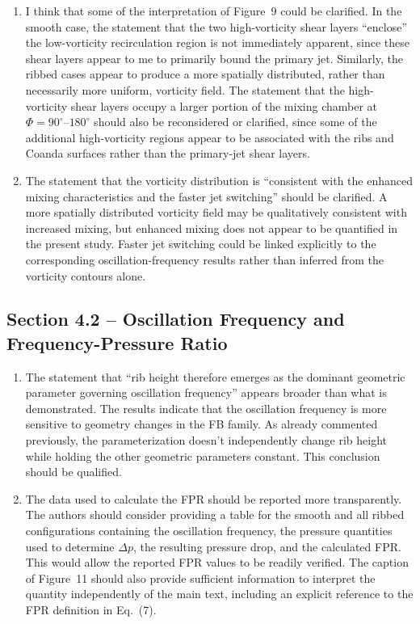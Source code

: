 \documentclass[11pt]{article}
\begin{document}
\begin{enumerate}
		\item I think that some of the interpretation of Figure~9 could be clarified. In the smooth case, the statement that the two high-vorticity shear layers ``enclose'' the low-vorticity recirculation region is not immediately apparent, since these shear layers appear to me to primarily bound the primary jet. Similarly, the ribbed cases appear to produce a more spatially distributed, rather than necessarily more uniform, vorticity field. The statement that the high-vorticity shear layers occupy a larger portion of the mixing chamber at $\Phi=90^\circ$--$180^\circ$ should also be reconsidered or clarified, since some of the additional high-vorticity regions appear to be associated with the ribs and Coanda surfaces rather than the primary-jet shear layers.
		
		\item The statement that the vorticity distribution is ``consistent with the enhanced mixing characteristics and the faster jet switching'' should be clarified. A more spatially distributed vorticity field may be qualitatively consistent with increased mixing, but enhanced mixing does not appear to be quantified in the present study. Faster jet switching could be linked explicitly to the corresponding oscillation-frequency results rather than inferred from the vorticity contours alone.
	\end{enumerate}
	
	\subsection*{Section 4.2 -- Oscillation Frequency and Frequency-Pressure Ratio}
	
	\begin{enumerate}
		\item The statement that ``rib height therefore emerges as the dominant geometric parameter governing oscillation frequency'' appears broader than what is demonstrated. The results indicate that the oscillation frequency is more sensitive to geometry changes in the FB family. As already commented previously, the parameterization doesn't independently change rib height while holding the other geometric parameters constant. This conclusion should be qualified.
		
		\item The data used to calculate the FPR should be reported more transparently. The authors should consider providing a table for the smooth and all ribbed configurations containing the oscillation frequency, the pressure quantities used to determine $\Delta p$, the resulting pressure drop, and the calculated FPR. This would allow the reported FPR values to be readily verified. The caption of Figure~11 should also provide sufficient information to interpret the quantity independently of the main text, including an explicit reference to the FPR definition in Eq.~(7).
	\end{enumerate}
	
\end{document}
